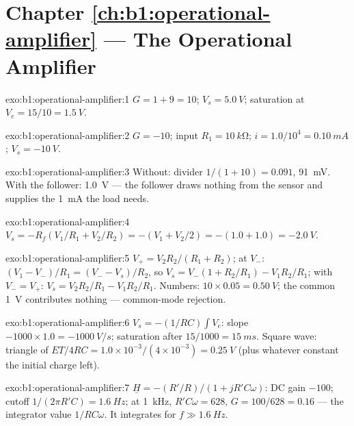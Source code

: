 \section*{Chapter \ref{ch:b1:operational-amplifier} --- The Operational Amplifier}

\begin{solution}{exo:b1:operational-amplifier:1}
$G = 1 + 9 = 10$; $V_s = \qty{5.0}{V}$; saturation at $V_e = 15/10 =
\qty{1.5}{V}$.
\end{solution}

\begin{solution}{exo:b1:operational-amplifier:2}
$G = -10$; input  $R_1 = \qty{10}{k\ohm}$; $i = 1.0/10^4 =
\qty{0.10}{mA}$; $V_s = \qty{-10}{V}$.
\end{solution}

\begin{solution}{exo:b1:operational-amplifier:3}
Without: divider $1/(1 + 10) = 0.091$, \qty{91}{mV}. With the follower:
\qty{1.0}{V} --- the follower draws nothing from the sensor and supplies
the \qty{1}{mA} the load needs.
\end{solution}

\begin{solution}{exo:b1:operational-amplifier:4}
$V_s = -R_f(V_1/R_1 + V_2/R_2) = -(V_1 + V_2/2) = -(1.0 + 1.0) = \qty{-2.0}{V}$.
\end{solution}

\begin{solution}{exo:b1:operational-amplifier:5}
$V_+ = V_2R_2/(R_1 + R_2)$; at $V_-$: $(V_1 - V_-)/R_1 = (V_- - V_s)/R_2$,
so $V_s = V_-(1 + R_2/R_1) - V_1R_2/R_1$; with $V_- = V_+$:
$V_s = V_2R_2/R_1 - V_1R_2/R_1$. Numbers: $10 \times 0.05 = \qty{0.50}{V}$;
the common \qty{1}{V} contributes nothing --- common-mode rejection.
\end{solution}

\begin{solution}{exo:b1:operational-amplifier:6}
$V_s = -(1/RC)\int V_e$: slope $-1000 \times 1.0 = \qty{-1000}{V/s}$;
saturation after $15/1000 = \qty{15}{ms}$. Square wave: triangle of
 $ET/4RC = 1.0 \times 10^{-3}/(4 \times 10^{-3}) = \qty{0.25}{V}$
(plus whatever constant the initial charge left).
\end{solution}

\begin{solution}{exo:b1:operational-amplifier:7}
$\underline H = -(R'/R)/(1 + jR'C\omega)$: DC gain $-100$; cutoff
$1/(2\pi R'C) = \qty{1.6}{Hz}$; at \qty{1}{kHz}, $R'C\omega = 628$, $G =
100/628 = 0.16$ --- the integrator value $1/RC\omega$. It integrates for
$f \gg \qty{1.6}{Hz}$.
\end{solution}

